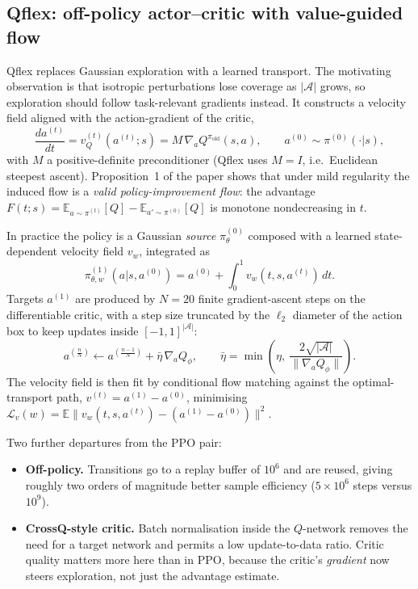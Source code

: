 \documentclass[11pt,a4paper]{article}
\begin{document}
\subsection{Qflex: off-policy actor--critic with value-guided flow}

Qflex replaces Gaussian exploration with a learned transport. The motivating observation
is that isotropic perturbations lose coverage as $|\mathcal{A}|$ grows, so exploration
should follow task-relevant gradients instead. It constructs a velocity field aligned
with the action-gradient of the critic,
\begin{equation}
\frac{da^{(t)}}{dt} = v_Q^{(t)}(a^{(t)};s) = M\,\nabla_a Q^{\pi_{\text{old}}}(s,a),
\qquad a^{(0)} \sim \pi^{(0)}(\cdot|s),
\end{equation}
with $M$ a positive-definite preconditioner (Qflex uses $M=I$, i.e.\ Euclidean steepest
ascent). Proposition~1 of the paper shows that under mild regularity the induced flow is
a \emph{valid policy-improvement flow}: the advantage
$F(t;s) = \mathbb{E}_{a\sim\pi^{(t)}}[Q] - \mathbb{E}_{a'\sim\pi^{(0)}}[Q]$
is monotone nondecreasing in $t$.

In practice the policy is a Gaussian \emph{source} $\pi^{(0)}_\theta$ composed with a
learned state-dependent velocity field $v_w$, integrated as
\begin{equation}
\pi^{(1)}_{\theta,w}(a|s,a^{(0)}) = a^{(0)} + \int_0^1 v_w(t,s,a^{(t)})\,dt .
\end{equation}
Targets $a^{(1)}$ are produced by $N=20$ finite gradient-ascent steps on the
differentiable critic, with a step size truncated by the $\ell_2$ diameter of the action
box to keep updates inside $[-1,1]^{|\mathcal{A}|}$:
\begin{equation}
a^{(\frac{n}{N})} \leftarrow a^{(\frac{n-1}{N})} + \bar\eta\,\nabla_a Q_\phi,
\qquad
\bar\eta = \min\!\left(\eta,\ \frac{2\sqrt{|\mathcal{A}|}}{\|\nabla_a Q_\phi\|}\right).
\end{equation}
The velocity field is then fit by conditional flow matching against the optimal-transport
path, $v^{(t)} = a^{(1)} - a^{(0)}$, minimising
$\mathcal{L}_v(w) = \mathbb{E}\|v_w(t,s,a^{(t)}) - (a^{(1)}-a^{(0)})\|^2$.

Two further departures from the PPO pair:
\begin{itemize}[leftmargin=1.4em,itemsep=0.2em]
\item \textbf{Off-policy.} Transitions go to a replay buffer of $10^6$ and are reused,
giving roughly two orders of magnitude better sample efficiency
($5\times10^6$ steps versus $10^9$).
\item \textbf{CrossQ-style critic.} Batch normalisation inside the $Q$-network removes the
need for a target network and permits a low update-to-data ratio. Critic quality matters
more here than in PPO, because the critic's \emph{gradient} now steers exploration, not
just the advantage estimate.
\end{itemize}
\end{document}
